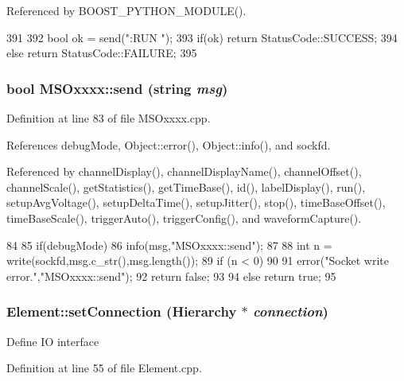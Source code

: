 Referenced by BOOST\_\-PYTHON\_\-MODULE().


\begin{DoxyCode}
391 {
392     bool ok = send(":RUN \n");
393     if(ok)  return StatusCode::SUCCESS;
394     else        return StatusCode::FAILURE;
395 }
\end{DoxyCode}
\hypertarget{classMSOxxxx_ae77668a1ae4ccb74e0ed5f2485dfdebf}{
\subsubsection[{send}]{\setlength{\rightskip}{0pt plus 5cm}bool MSOxxxx::send (string {\em msg})}}
\label{classMSOxxxx_ae77668a1ae4ccb74e0ed5f2485dfdebf}


Definition at line 83 of file MSOxxxx.cpp.

References debugMode, Object::error(), Object::info(), and sockfd.

Referenced by channelDisplay(), channelDisplayName(), channelOffset(), channelScale(), getStatistics(), getTimeBase(), id(), labelDisplay(), run(), setupAvgVoltage(), setupDeltaTime(), setupJitter(), stop(), timeBaseOffset(), timeBaseScale(), triggerAuto(), triggerConfig(), and waveformCapture().


\begin{DoxyCode}
84 {
85     if(debugMode)
86         info(msg,"MSOxxxx::send");
87 
88     int n = write(sockfd,msg.c_str(),msg.length());
89     if (n < 0)
90     {
91         error("Socket write error.","MSOxxxx::send");
92         return false;
93     }
94     else return true;
95 }
\end{DoxyCode}
\hypertarget{classElement_ab476b4b1df5954141ceb14f072433b89}{
\subsubsection[{setConnection}]{ Element::setConnection ({\bf Hierarchy} $\ast$ {\em connection})}}
\label{classElement_ab476b4b1df5954141ceb14f072433b89}
Define IO interface 

Definition at line 55 of file Element.cpp.

